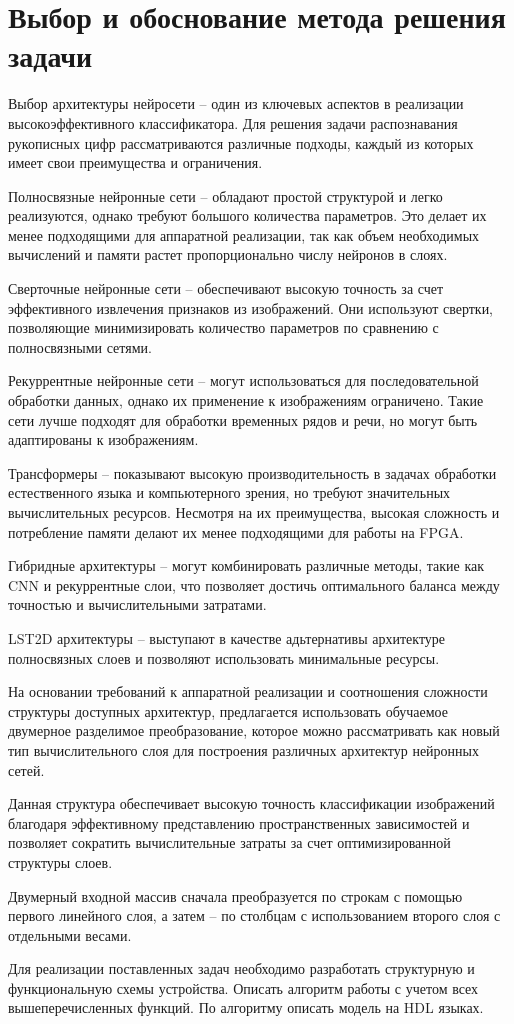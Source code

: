 \section{Выбор и обоснование метода решения задачи}
\hspace*{12.5 mm}Выбор архитектуры нейросети – один из ключевых аспектов в 
реализации высокоэффективного классификатора. Для решения задачи распознавания 
рукописных цифр рассматриваются различные подходы, каждый из которых имеет свои преимущества и 
ограничения.

Полносвязные нейронные сети  – обладают простой структурой и легко реализуются, 
однако требуют большого количества параметров. Это делает их менее подходящими 
для аппаратной реализации, так как объем необходимых вычислений и памяти растет
пропорционально числу нейронов в слоях.

Сверточные нейронные сети – обеспечивают высокую точность за счет эффективного 
извлечения признаков из изображений. Они используют свертки, позволяющие 
минимизировать количество параметров по сравнению с полносвязными сетями. 

Рекуррентные нейронные сети – могут использоваться для последовательной 
обработки данных, однако их применение к изображениям ограничено. Такие 
сети лучше подходят для обработки временных рядов и речи, но могут быть 
адаптированы к изображениям.

Трансформеры – показывают высокую производительность в задачах обработки 
естественного языка и компьютерного зрения, но требуют значительных 
вычислительных ресурсов. Несмотря на их преимущества, высокая сложность и 
потребление памяти делают их менее подходящими для работы на FPGA.\@

Гибридные архитектуры – могут комбинировать различные методы, такие как CNN и 
рекуррентные слои, что позволяет достичь оптимального баланса между точностью и
вычислительными затратами.

LST2D архитектуры – выступают в качестве адьтернативы архитектуре полносвязных 
слоев и позволяют использовать минимальные ресурсы.

На основании требований к аппаратной реализации и соотношения сложности 
структуры доступных архитектур, предлагается использовать обучаемое двумерное 
разделимое преобразование, которое можно рассматривать как новый тип 
вычислительного слоя для построения различных архитектур нейронных сетей\cite{LST2D}. 

Данная структура обеспечивает высокую точность классификации изображений 
благодаря эффективному представлению пространственных зависимостей и 
позволяет сократить вычислительные затраты за счет оптимизированной структуры 
слоев.

Двумерный входной массив сначала преобразуется по строкам с помощью первого 
линейного слоя, а затем – по столбцам с использованием второго слоя с 
отдельными весами. 

Для реализации поставленных задач необходимо разработать структурную и 
функциональную схемы устройства. Описать алгоритм работы с учетом всех 
вышеперечисленных функций. По алгоритму описать модель на HDL языках.